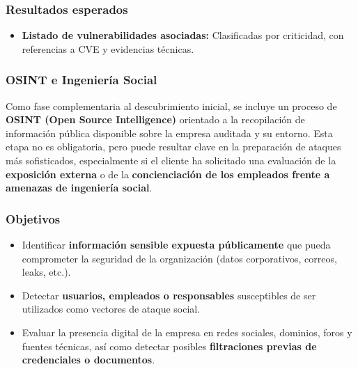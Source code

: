 \documentclass[a4paper, 11pt]{article}
\begin{document}
\vspace{0.3cm}

\subsubsection*{Resultados esperados}

\begin{itemize}
    \item \textbf{Listado de vulnerabilidades asociadas:} Clasificadas por criticidad, con referencias a CVE y evidencias técnicas.
    
\end{itemize}










\subsubsection{OSINT e Ingeniería Social}

Como fase complementaria al descubrimiento inicial, se incluye un proceso de \textbf{OSINT (Open Source Intelligence)} orientado a la recopilación de información pública disponible sobre la empresa auditada y su entorno. Esta etapa no es obligatoria, pero puede resultar clave en la preparación de ataques más sofisticados, especialmente si el cliente ha solicitado una evaluación de la \textbf{exposición externa} o de la \textbf{concienciación de los empleados frente a amenazas de ingeniería social}.


\subsubsection*{Objetivos}

\begin{itemize}
    \item Identificar \textbf{información sensible expuesta públicamente} que pueda comprometer la seguridad de la organización (datos corporativos, correos, leaks, etc.).
    \item Detectar \textbf{usuarios, empleados o responsables} susceptibles de ser utilizados como vectores de ataque social.
    \item Evaluar la presencia digital de la empresa en redes sociales, dominios, foros y fuentes técnicas, así como detectar posibles \textbf{filtraciones previas de credenciales o documentos}.
\end{itemize}
\end{document}
